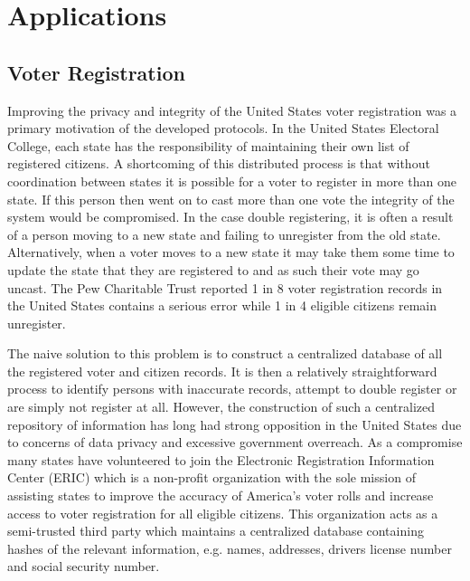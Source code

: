 \section{Applications}\label{sec:app}
\subsection{Voter Registration}\label{sec:voter}

Improving the privacy and integrity of the United States voter registration was a primary motivation of the developed protocols. In  the United States Electoral College, each state has the responsibility of maintaining their own list of registered citizens. A shortcoming of this distributed process is that without coordination between states it is possible for a voter to register in more than one state. If this person then went on to cast more than one vote the integrity of the system would be compromised. In the case double registering, it is often a result of a person moving to a new state and failing to unregister from the old state. Alternatively, when a voter moves to a new state it may take them some time to update the state that they are registered to and as such their vote may go uncast. The Pew Charitable Trust\cite{pew} reported 1 in 8 voter registration records in the United States contains a serious error while 1 in 4 eligible citizens remain unregister. 

The naive solution to this problem is to construct a centralized database of all the registered voter and citizen records. It is then a relatively straightforward process to identify persons with inaccurate records, attempt to double register or are simply not register at all. However, the construction of such a centralized repository of information has long had strong opposition in the United States due to concerns of data privacy and  excessive government overreach. As a compromise many states have volunteered to join the Electronic Registration Information Center (ERIC)\cite{eric} which is a non-profit organization with the sole mission of assisting states to improve the accuracy of America’s voter rolls and increase access to voter registration for all eligible citizens. This organization acts as a semi-trusted third party which maintains a centralized database containing hashes of the relevant information, e.g. names, addresses, drivers license number and social security number. 

